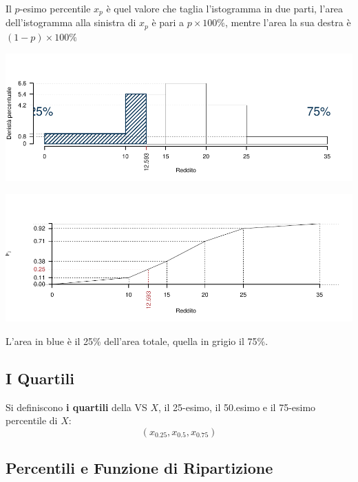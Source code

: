 \documentclass[
  11pt,
]{book}
\theoremstyle{mytheoremstyle}
\theoremstyle{mydefstyle}
\newenvironment{nota}
  {
\begin{tcolorbox}[enhanced,breakable,arc=0.1mm,boxrule=1pt,colback=white,colframe=iblue,title=\bf \fontfamily{lmss}\selectfont \faInfoCircle \hspace{.5 cm} Nota,drop fuzzy shadow]
}{
\end{tcolorbox}
  }
\begin{document}
\begin{nota}
Il \(p\)-esimo percentile \(x_p\) è quel valore che taglia l'istogramma in due parti, l'area dell'istogramma alla sinistra di \(x_p\) è pari a \(p\times 100\%\), mentre l'area la sua destra è \((1-p)\times 100\%\)

\begin{center}\includegraphics{Appunti_di_Statistica_2025_files/figure-latex/04-mediana-percentili-9,-1} \end{center}

\begin{center}\includegraphics{Appunti_di_Statistica_2025_files/figure-latex/04-mediana-percentili-9,-2} \end{center}

L'area in blue è il 25\% dell'area totale, quella in grigio il 75\%.

\end{nota}

\subsection{I Quartili}\label{i-quartili}

Si definiscono \textbf{i quartili} della VS \(X\), il 25-esimo, il 50.esimo e il 75-esimo percentile di \(X\):
\[
(x_{0.25},x_{0.5},x_{0.75})
\]

\subsection{Percentili e Funzione di Ripartizione}\label{percentili-e-funzione-di-ripartizione}
\end{document}

